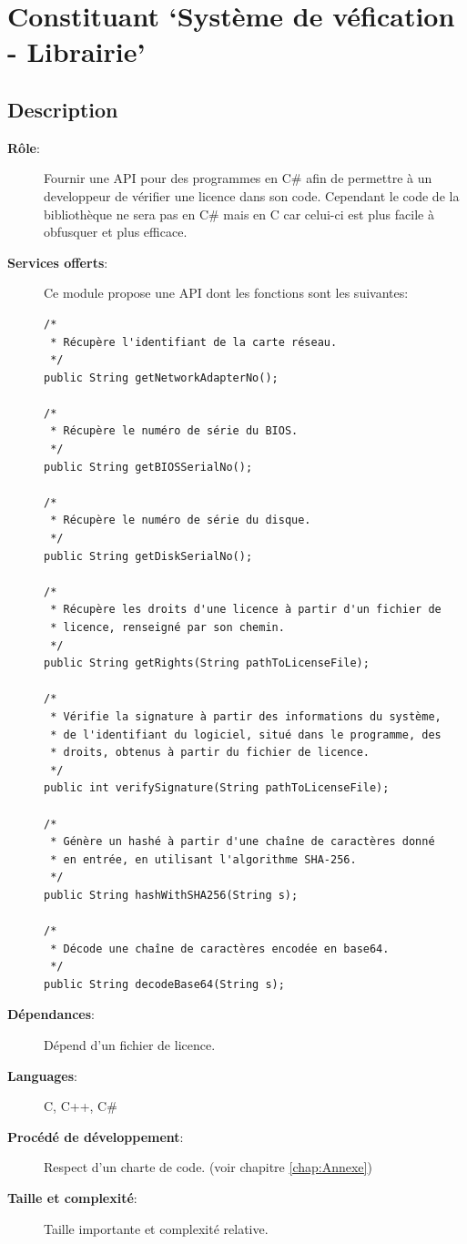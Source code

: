 \section{Constituant `Système de véfication - Librairie'}
\subsection{Description}
\begin{description}
	\item[\textbf{Rôle}:]
		Fournir une API pour des programmes en C\# afin de 
		permettre à un developpeur de vérifier une licence dans son code.
        Cependant le code de la bibliothèque ne sera pas en C\# mais en 
        C car celui-ci est plus facile à obfusquer et plus efficace. 

	\newpage

	\item[\textbf{Services offerts}:]
		Ce module propose une API dont les fonctions sont les suivantes:
\begin{verbatim}
/*
 * Récupère l'identifiant de la carte réseau.
 */
public String getNetworkAdapterNo();

/*
 * Récupère le numéro de série du BIOS.
 */
public String getBIOSSerialNo();

/*
 * Récupère le numéro de série du disque.
 */
public String getDiskSerialNo();

/*
 * Récupère les droits d'une licence à partir d'un fichier de
 * licence, renseigné par son chemin.
 */
public String getRights(String pathToLicenseFile);

/*
 * Vérifie la signature à partir des informations du système,
 * de l'identifiant du logiciel, situé dans le programme, des
 * droits, obtenus à partir du fichier de licence.
 */
public int verifySignature(String pathToLicenseFile);

/*
 * Génère un hashé à partir d'une chaîne de caractères donné
 * en entrée, en utilisant l'algorithme SHA-256.
 */
public String hashWithSHA256(String s);

/*
 * Décode une chaîne de caractères encodée en base64.
 */
public String decodeBase64(String s);
\end{verbatim}

	\item[\textbf{Dépendances}:]
		Dépend d'un fichier de licence.	
	\item[\textbf{Languages}:]
		C, C++, C\#
	\item[\textbf{Procédé de développement}:]
		Respect d'un charte de code. (voir chapitre \ref{chap:Annexe})
	\item[\textbf{Taille et complexité}:]
		Taille importante et complexité relative.
\end{description}

